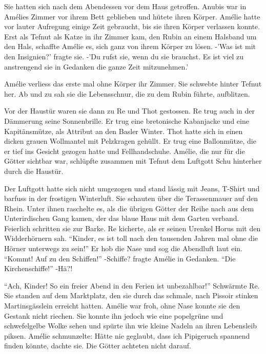 \documentclass[11pt,titlepage,a5paper]{book}
\begin{document}
Sie hatten sich nach dem Abendessen vor dem Haus getroffen. Anubis war in Amélies Zimmer vor ihrem Bett geblieben und hütete ihren Körper. Amélie hatte vor lauter Aufregung einige Zeit gebraucht, bis sie ihren Körper verlassen konnte. Erst als Tefnut als Katze in ihr Zimmer kam, den Rubin an einem Halsband um den Hals,  schaffte Amélie es, sich ganz von ihrem Körper zu lösen. -'Was ist mit den Insignien?' fragte sie. -'Du rufst sie, wenn du sie brauchst. Es ist viel zu anstrengend sie in Gedanken die ganze Zeit mitzunehmen.'

Amélie verliess das erste mal ohne Körper ihr Zimmer. Sie schwebte hinter Tefnut her. Ab und zu sah sie die Lebensschnur, die zu dem Rubin führte, aufblitzen.

Vor der Haustür waren sie dann zu Re und Thot gestossen. Re trug auch in der Dämmerung seine Sonnenbrille. Er trug eine bretonische Kabanjacke und eine Kapitänsmütze, als Attribut an den Basler Winter. Thot hatte sich in einen dicken grauen Wollmantel mit Pelzkragen gehüllt. Er trug eine Ballonmütze, die er tief ins Gesicht gezogen hatte und Fellhandschuhe. Amélie, die nur für die Götter sichtbar war, schlüpfte zusammen mit Tefnut dem Luftgott Schu hinterher durch die Haustür.

Der Luftgott hatte sich nicht umgezogen und stand lässig mit Jeans, T-Shirt und barfuss in der frostigen Winterluft. Sie schauten über die Terassenmauer auf den Rhein. Unter ihnen raschelte es, als die übrigen Götter der Reihe nach aus dem Unterirdischen Gang kamen, der das blaue Haus mit dem Garten verband. Feierlich schritten sie zur Barke. Re kicherte, als er seinen Urenkel Horus mit den Widderhörnern sah. "`Kinder, es ist toll nach den tausenden Jahren mal ohne die Hörner unterwegs zu sein!"' Er hob die Nase und sog die Abendluft laut ein. "`Kommt! Auf zu den Schiffen!"' -Schiffe? fragte Amélie in Gedanken. "`Die Kirchenschiffe!"' -Hä?!

"`Ach, Kinder! So ein freier Abend in den Ferien ist unbezahlbar!"' Schwärmte Re. Sie standen auf dem Marktplatz, den sie durch das schmale, nach Pissoir stinken Martinsgässlein erreicht hatten. Amélie war froh, ohne Nase konnte sie den Gestank nicht riechen. Sie konnte ihn jedoch wie eine popelgrüne und schwefelgelbe Wolke sehen und spürte ihn wie kleine Nadeln an ihren Lebensleib piksen. Amélie schmunzelte: Hätte nie geglaubt, dass ich Pipigeruch spannend finden könnte, dachte sie. Die Götter achteten nicht darauf.
\end{document}
